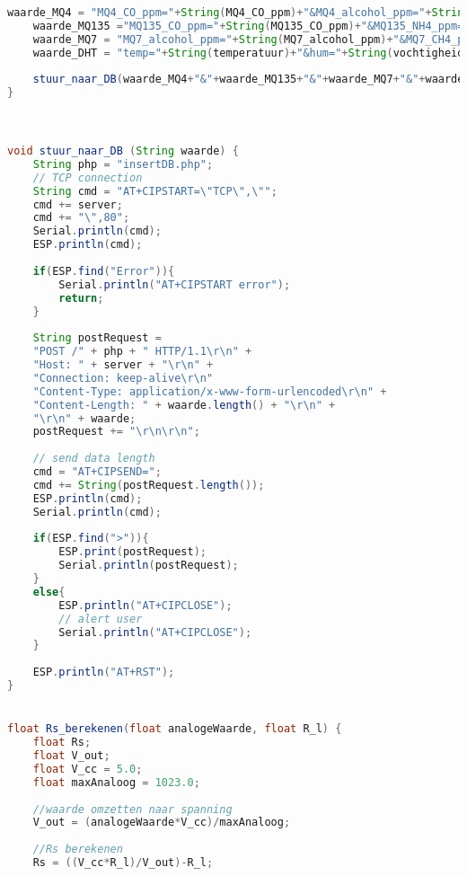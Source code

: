 \begin{lstlisting}[language=Java,caption={MQ sensoren naar de databank}]
    waarde_MQ4 = "MQ4_CO_ppm="+String(MQ4_CO_ppm)+"&MQ4_alcohol_ppm="+String(MQ4_alcohol_ppm)+"&MQ4_rook_ppm="+String(MQ4_rook_ppm)+"&MQ4_H2_ppm="+String(MQ4_H2_ppm)+"&MQ4_LPG_ppm="+String(MQ4_LPG_ppm)+"&MQ4_CH4_ppm="+String(MQ4_CH4_ppm);
    waarde_MQ135 ="MQ135_CO_ppm="+String(MQ135_CO_ppm)+"&MQ135_NH4_ppm="+String(MQ135_NH4_ppm)+"&MQ135_CO2_ppm="+String(MQ135_CO2_ppm)+"&MQ135_alcohol_ppm="+String(MQ135_alcohol_ppm)+"&MQ135_tolueen_ppm="+String(MQ135_tolueen_ppm)+"&MQ135_aceton_ppm="+String(MQ135_aceton_ppm);
    waarde_MQ7 = "MQ7_alcohol_ppm="+String(MQ7_alcohol_ppm)+"&MQ7_CH4_ppm="+String(MQ7_CH4_ppm)+"&MQ7_LPG_ppm="+String(MQ7_LPG_ppm)+"&MQ7_CO_ppm="+String(MQ7_CO_ppm)+"&MQ7_H2_ppm="+String(MQ7_H2_ppm);
    waarde_DHT = "temp="+String(temperatuur)+"&hum="+String(vochtigheid);
    
    stuur_naar_DB(waarde_MQ4+"&"+waarde_MQ135+"&"+waarde_MQ7+"&"+waarde_DHT);  
}



void stuur_naar_DB (String waarde) {
    String php = "insertDB.php";
    // TCP connection
    String cmd = "AT+CIPSTART=\"TCP\",\"";
    cmd += server;
    cmd += "\",80";
    Serial.println(cmd);
    ESP.println(cmd);
    
    if(ESP.find("Error")){
        Serial.println("AT+CIPSTART error");
        return;
    }
    
    String postRequest =
    "POST /" + php + " HTTP/1.1\r\n" +
    "Host: " + server + "\r\n" +
    "Connection: keep-alive\r\n"
    "Content-Type: application/x-www-form-urlencoded\r\n" +
    "Content-Length: " + waarde.length() + "\r\n" +
    "\r\n" + waarde;
    postRequest += "\r\n\r\n";
    
    // send data length
    cmd = "AT+CIPSEND=";
    cmd += String(postRequest.length());
    ESP.println(cmd);
    Serial.println(cmd);
    
    if(ESP.find(">")){
        ESP.print(postRequest);
        Serial.println(postRequest);
    }
    else{
        ESP.println("AT+CIPCLOSE");
        // alert user
        Serial.println("AT+CIPCLOSE");
    }
    
    ESP.println("AT+RST");
}


float Rs_berekenen(float analogeWaarde, float R_l) {
    float Rs;
    float V_out;
    float V_cc = 5.0;
    float maxAnaloog = 1023.0;
    
    //waarde omzetten naar spanning
    V_out = (analogeWaarde*V_cc)/maxAnaloog;
    
    //Rs berekenen
    Rs = ((V_cc*R_l)/V_out)-R_l;
    

\end{lstlisting}

